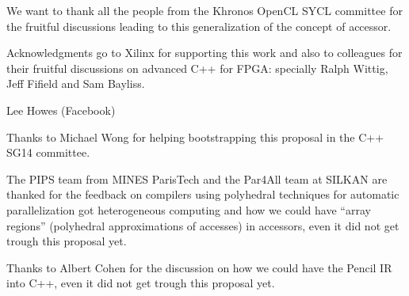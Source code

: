 \documentclass[a4paper]{article}
\begin{document}
We want to thank all the people from the Khronos OpenCL SYCL committee
for the fruitful discussions leading to this generalization of the
concept of accessor.

Acknowledgments go to Xilinx for supporting this work and also to
colleagues for their fruitful discussions on advanced C++ for FPGA:
specially Ralph Wittig, Jeff Fifield and Sam Bayliss.

Lee Howes (Facebook)

Thanks to Michael Wong for helping bootstrapping this proposal in the
C++ SG14 committee.

The PIPS team from MINES ParisTech and the Par4All team at SILKAN are
thanked for the feedback on compilers using polyhedral techniques for
automatic parallelization got heterogeneous computing and how we could
have ``array regions'' (polyhedral approximations of accesses) in
accessors, even it did not get trough this proposal yet.

Thanks to Albert Cohen for the discussion on how we could have the
Pencil IR into C++, even it did not get trough this proposal yet.
\end{document}
